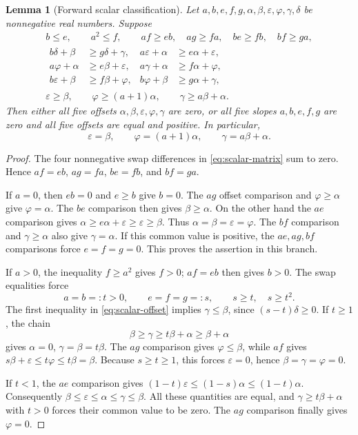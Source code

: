 \documentclass[11pt,a4paper]{article}
\newtheorem{lemma}[theorem]{Lemma}
\begin{document}
\begin{lemma}[Forward scalar classification]\label{lem:scalar-forward}
Let \(a,b,e,f,g,\alpha,\beta,\varepsilon,\varphi,\gamma,\delta\)
be nonnegative real numbers. Suppose
\begin{gather}
b\le e,\qquad a^2\le f,\qquad
af\ge eb,\quad ag\ge fa,\quad be\ge fb,\quad bf\ge ga,
\label{eq:scalar-matrix}\\
\begin{aligned}
b\delta+\beta&\ge g\delta+\gamma,&
a\varepsilon+\alpha&\ge e\alpha+\varepsilon,\\
a\varphi+\alpha&\ge e\beta+\varepsilon,&
a\gamma+\alpha&\ge f\alpha+\varphi,\\
b\varepsilon+\beta&\ge f\beta+\varphi,&
b\varphi+\beta&\ge g\alpha+\gamma,
\end{aligned}\label{eq:scalar-offset}\\
\varepsilon\ge\beta,\qquad
\varphi\ge(a+1)\alpha,\qquad
\gamma\ge a\beta+\alpha.\label{eq:scalar-boundary}
\end{gather}
Then either all five offsets
\(\alpha,\beta,\varepsilon,\varphi,\gamma\) are zero, or all five slopes
\(a,b,e,f,g\) are zero and all five offsets are equal and positive.
In particular,
\[
\varepsilon=\beta,\qquad
\varphi=(a+1)\alpha,\qquad
\gamma=a\beta+\alpha.
\]
\end{lemma}
\begin{proof}
The four nonnegative swap differences in
\eqref{eq:scalar-matrix} sum to zero. Hence
\(af=eb\), \(ag=fa\), \(be=fb\), and \(bf=ga\).

If \(a=0\), then \(eb=0\) and \(e\ge b\) give \(b=0\).
The \(ag\) offset comparison and
\(\varphi\ge\alpha\) give \(\varphi=\alpha\).
The \(be\) comparison then gives \(\beta\ge\alpha\).
On the other hand the \(ae\) comparison gives
\(\alpha\ge e\alpha+\varepsilon\ge\varepsilon\ge\beta\).
Thus \(\alpha=\beta=\varepsilon=\varphi\).
The \(bf\) comparison and \(\gamma\ge\alpha\) also give
\(\gamma=\alpha\). If this common value is positive, the \(ae,ag,bf\)
comparisons force \(e=f=g=0\). This proves the assertion in this branch.

If \(a>0\), the inequality \(f\ge a^2\) gives \(f>0\);
\(af=eb\) then gives \(b>0\). The swap equalities force
\[
a=b=:t>0,\qquad e=f=g=:s,\qquad s\ge t,\quad s\ge t^2.
\]
The first inequality in \eqref{eq:scalar-offset} implies
\(\gamma\le\beta\), since \((s-t)\delta\ge0\).
If \(t\ge1\), the chain
\[
\beta\ge\gamma\ge t\beta+\alpha\ge\beta+\alpha
\]
gives \(\alpha=0\), \(\gamma=\beta=t\beta\).
The \(ag\) comparison gives \(\varphi\le\beta\), while \(af\) gives
\(s\beta+\varepsilon\le t\varphi\le t\beta=\beta\).
Because \(s\ge t\ge1\), this forces
\(\varepsilon=0\), hence \(\beta=\gamma=\varphi=0\).

If \(t<1\), the \(ae\) comparison gives
\((1-t)\varepsilon\le(1-s)\alpha\le(1-t)\alpha\).
Consequently
\(\beta\le\varepsilon\le\alpha\le\gamma\le\beta\).
All these quantities are equal, and
\(\gamma\ge t\beta+\alpha\) with \(t>0\) forces their common value
to be zero. The \(ag\) comparison finally gives \(\varphi=0\).
\end{proof}
\end{document}
